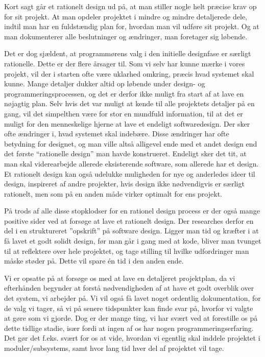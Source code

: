\documentclass[12pt,a4paper]{article}
\begin{document}
Kort sagt går et rationelt design ud på, at man stiller nogle helt præcise krav op for sit projekt. At man opdeler projektet i mindre og mindre detaljerede dele, indtil man har en fuldstændig plan for, hvordan man vil udføre sit projekt. Og at man dokumenterer alle beslutninger og ændringer, man foretager sig løbende.

Det er dog sjældent, at programmørens valg i den initielle designfase er særligt rationelle. Dette er der flere årsager til. Som vi selv har kunne mærke i vores projekt, vil der i starten ofte være uklarhed omkring, præcis hvad systemet skal kunne. Mange detaljer dukker altid op løbende under design- og programmeringsprocessen, og det er derfor ikke muligt fra start af at lave en nøjagtig plan. Selv hvis det var muligt at kende til alle projektets detaljer på en gang, vil det simpelthen være for stor en mundfuld information, til at det er muligt for den menneskelige hjerne at lave et endeligt softwaredesign. Der sker ofte ændringer i, hvad systemet skal indebære. Disse ændringer har ofte betydning for designet, og man ville altså alligevel ende med et andet design end det første “rationelle design” man havde konstrueret. Endeligt sker det tit, at man skal viderearbejde allerede eksisterende software, som allerede har et design. Et rationelt design kan også udelukke muligheden for nye og anderledes ideer til design, inspireret af andre projekter, hvis design ikke nødvendigvis er særligt rationelt, men som på en anden måde virker optimalt for ens projekt.

På trods af alle disse stopklodser for en rationel design process er der også mange positive sider ved at forsøge at lave et rationelt design. Der researches derfor en del i en struktureret ”opskrift” på software design.
Ligger man tid og kræfter i at få lavet et godt solidt design, før man går i gang med at kode, bliver man tvunget til at reflektere over hele projektet, og tage stilling til hvilke udfordringer man måske støder på. Dette vil spare én tid i den anden ende.

Vi er opsatte på at forsøge os med at lave en detaljeret projektplan, da vi efterhånden begynder at forstå nødvendigheden af at have et godt overblik over det system, vi arbejder på. Vi vil også få lavet noget ordentlig dokumentation, for de valg vi tager, så vi på senere tidspunkter kan finde svar på, hvorfor vi valgte at gøre som vi gjorde. 
Dog er der mange ting, vi har svært ved at forestille os på dette tidlige stadie, især fordi at ingen af os har nogen programmeringserfaring. Det gør det f.eks. svært for os at vide, hvordan vi egentlig skal inddele projektet i moduler/subsystems, samt hvor lang tid hver del af projektet vil tage.
\end{document}

